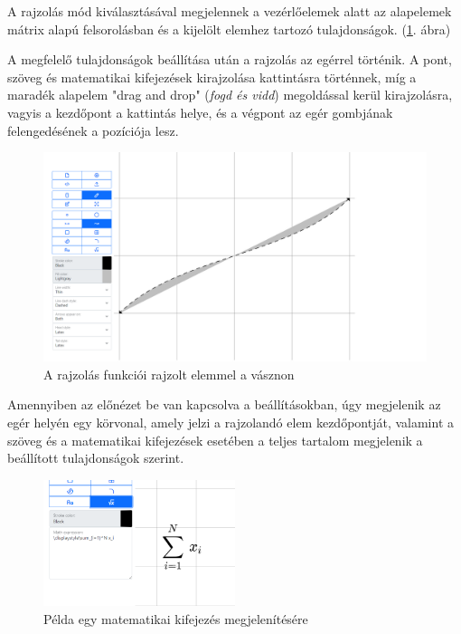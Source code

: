 
A rajzolás mód kiválasztásával megjelennek a vezérlőelemek alatt az alapelemek mátrix alapú felsorolásban és a kijelölt elemhez tartozó tulajdonságok.  (\ref{fig:draw}. ábra)

A megfelelő tulajdonságok beállítása után a rajzolás az egérrel történik. A pont, szöveg és matematikai kifejezések kirajzolása kattintásra történnek, míg a maradék alapelem "drag and drop" (\textit{fogd és vidd}) megoldással kerül kirajzolásra, vagyis a kezdőpont a kattintás helye, és a végpont az egér gombjának felengedésének a pozíciója lesz.

\begin{figure}[!h]
	\centering
	\includegraphics[width=\textwidth]{images/editor_draw.png}
	\caption{A rajzolás funkciói rajzolt elemmel a vásznon}
	\label{fig:draw}
\end{figure}

Amennyiben az előnézet be van kapcsolva a beállításokban, úgy megjelenik az egér helyén egy körvonal, amely jelzi a rajzolandó elem kezdőpontját, valamint a szöveg és a matematikai kifejezések esetében a teljes tartalom megjelenik a beállított tulajdonságok szerint.



\begin{figure}[!h]
	\centering
	\includegraphics[width=0.5\textwidth]{images/math.png}
	\caption{Példa egy matematikai kifejezés megjelenítésére}
	\label{fig:math}
\end{figure}

